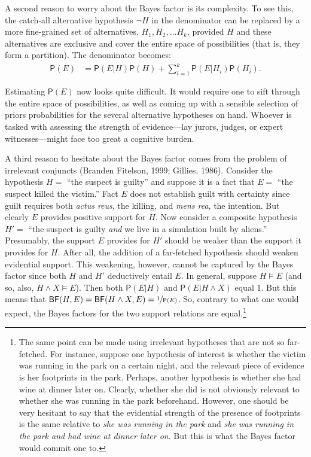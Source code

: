 \documentclass[
  10pt,
  dvipsnames,enabledeprecatedfontcommands]{scrartcl}
\newcommand{\et}{\wedge}
\newcommand{\pr}[1]{\mathsf{P}(#1)}
\begin{document}
A second reason to worry about the Bayes factor is its complexity. To
see this, the catch-all alternative hypothesis \(\neg H\) in the
denominator can be replaced by a more fine-grained set of alternatives,
\(H_1, H_2, \dots H_k\), provided \(H\) and these alternatives are
exclusive and cover the entire space of possibilities (that is, they
form a partition). The denominator becomes:
\begin{align} \label{eq:lotpLong}
\pr{E} & = \pr{E\vert H}\pr{H} +\sum_{i=1}^k \pr{E\vert H_i}\pr{H_i}. 
\end{align}

\noindent Estimating \(\pr{E}\) now looks quite difficult. It would
require one to sift through the entire space of possibilities, as well
as coming up with a sensible selection of priors probabilities for the
several alternative hypotheses on hand. Whoever is tasked with assessing
the strength of evidence---lay jurors, judges, or expert
witnesses---might face too great a cognitive burden.

A third reason to hesitate about the Bayes factor comes from the problem
of irrelevant conjuncts (Branden Fitelson, 1999; Gillies, 1986).
Consider the hypothesis \(H =\) ``the suspect is guilty'' and suppose it
is a fact that \(E =\) ``the suspect killed the victim.'' Fact \(E\)
does not establish guilt with certainty since guilt requires both
\emph{actus reus}, the killing, and \emph{mens rea}, the intention. But
clearly \(E\) provides positive support for \(H\). Now consider a
composite hypothesis \(H'=\) ``the suspect is guilty \textit{and} we
live in a simulation built by aliens.'' Presumably, the support \(E\)
provides for \(H'\) should be weaker than the support it provides for
\(H\). After all, the addition of a far-fetched hypothesis should weaken
evidential support. This weakening, however, cannot be captured by the
Bayes factor since both \(H\) and \(H'\) deductively entail \(E\). In
general, suppose \(H\models E\) (and so, also, \(H \et X \models E\)).
Then both \(\pr{E\vert H}\) and \(\pr{E \vert H \et X}\) equal 1. But
this means that
\(\mathsf{BF}(H,E) = \mathsf{BF}(H \et X, E) = \nicefrac{1}{\pr{E}}\).
So, contrary to what one would expect, the Bayes factors for the two
support relations are equal.\footnote{The same point can be made using
  irrelevant hypotheses that are not so far-fetched. For instance,
  suppose one hypothesis of interest is whether the victim was running
  in the park on a certain night, and the relevant piece of evidence is
  her footprints in the park. Perhaps, another hypothesis is whether she
  had wine at dinner later on. Clearly, whether she did is not obviously
  relevant to whether she was running in the park beforehand. However,
  one should be very hesitant to say that the evidential strength of the
  presence of footprints is the same relative to
  \emph{she was running in the park} and
  \emph{she was running in the park and had wine at dinner later on}.
  But this is what the Bayes factor would commit one to.}
\end{document}

